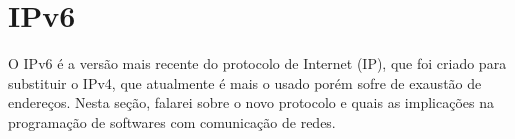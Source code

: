 
\section{IPv6}

O IPv6 é a versão mais recente do protocolo de Internet (IP), que foi criado para
substituir o IPv4, que atualmente é mais o usado porém sofre de exaustão de endereços.
Nesta seção, falarei sobre o novo protocolo e quais as implicações na programação de
softwares com comunicação de redes.